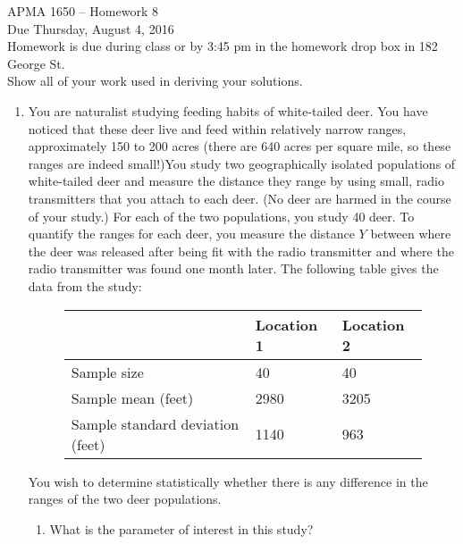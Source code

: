 \documentclass[12pt]{article}
\begin{document}
\title{}
\author{\vspace{-10ex} }

\begin{center}
{\LARGE APMA 1650 -- Homework 8}\\
\vspace{5mm}
{\large Due Thursday, August 4, 2016}\\
\vspace{5mm}
Homework is due during class or by 3:45 pm in the homework drop box in 182 George St.\\
Show all of your work used in deriving your solutions.
\end{center}

\begin{enumerate}

\item You are naturalist studying feeding habits of white-tailed deer. You have noticed that these deer live and feed within relatively narrow ranges, approximately 150 to 200 acres (there are 640 acres per square mile, so these ranges are indeed small!)You study two geographically isolated populations of white-tailed deer and measure the distance they range by using small, radio transmitters that you attach to each deer. (No deer are harmed in the course of your study.) For each of the two populations, you study 40 deer. To quantify the ranges for each deer, you measure the distance $Y$ between where the deer was released after being fit with the radio transmitter and where the radio transmitter was found one month later. The following table gives the data from the study:

\begin{figure}[H]
\centering
\begin{tabular}{l@{\hskip 2cm}l@{\hskip 2cm}l}
\toprule
& Location 1 & Location 2\\
\midrule
Sample size & 40 & 40 \\
Sample mean (feet) & 2980 & 3205 \\
Sample standard deviation (feet) & 1140 & 963 \\
\bottomrule
\end{tabular}
\end{figure}  

You wish to determine statistically whether there is any difference in the ranges of the two deer populations.
\begin{enumerate}
\item What is the parameter of interest in this study?\\


\end{enumerate}
\end{enumerate}
\end{document}
